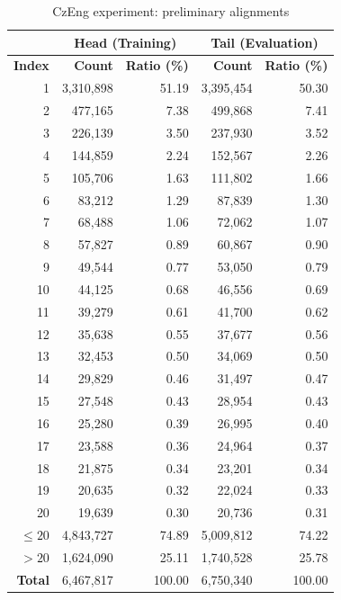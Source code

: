 \begin{table}[!htb]
	\centering
	\caption{CzEng experiment: preliminary alignments}
	\label{table:czeng_align}
	\vspace{1em}
	\begin{tabular}{|r||r|r||r|r|}
		\hline
		& \multicolumn{2}{c||}{\textbf{Head (Training)}} & \multicolumn{2}{c|}{\textbf{Tail (Evaluation)}} \\
		\hline
		\textbf{Index} & \textbf{Count} & \textbf{Ratio (\%)} & \textbf{Count} & \textbf{Ratio (\%)} \\ \hline
		1 & 3,310,898 & 51.19 & 3,395,454 & 50.30 \\
		2 & 477,165 & 7.38 & 499,868 & 7.41 \\
		3 & 226,139 & 3.50 & 237,930 & 3.52 \\
		4 & 144,859 & 2.24 & 152,567 & 2.26 \\
		5 & 105,706 & 1.63 & 111,802 & 1.66 \\
		6 & 83,212 & 1.29 & 87,839 & 1.30 \\
		7 & 68,488 & 1.06 & 72,062 & 1.07 \\
		8 & 57,827 & 0.89 & 60,867 & 0.90 \\
		9 & 49,544 & 0.77 & 53,050 & 0.79 \\
		10 & 44,125 & 0.68 & 46,556 & 0.69 \\
		11 & 39,279 & 0.61 & 41,700 & 0.62 \\
		12 & 35,638 & 0.55 & 37,677 & 0.56 \\
		13 & 32,453 & 0.50 & 34,069 & 0.50 \\
		14 & 29,829 & 0.46 & 31,497 & 0.47 \\
		15 & 27,548 & 0.43 & 28,954 & 0.43 \\
		16 & 25,280 & 0.39 & 26,995 & 0.40 \\
		17 & 23,588 & 0.36 & 24,964 & 0.37 \\
		18 & 21,875 & 0.34 & 23,201 & 0.34 \\
		19 & 20,635 & 0.32 & 22,024 & 0.33 \\
		20 & 19,639 & 0.30 & 20,736 & 0.31 \\
		\hline
		$\leq 20$ & 4,843,727 & 74.89 & 5,009,812 & 74.22 \\
		$> 20$ & 1,624,090 & 25.11 & 1,740,528 & 25.78 \\
		\hline
		\textbf{Total} & 6,467,817 & 100.00 & 6,750,340 & 100.00 \\
		\hline
	\end{tabular}
\end{table}

